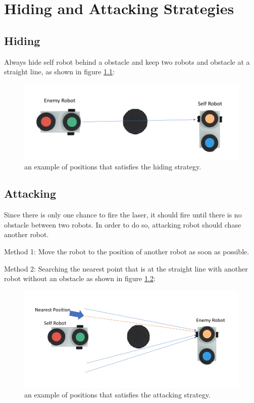 \chapter{Hiding and Attacking Strategies}
\label{cha:STRATEGIES}


\section{Hiding}
Always hide self robot behind a obstacle and keep two robots and obstacle at a straight line, as shown in figure \ref{hiding_strategy}:

\begin{figure}[thb]
    \centering
    \includegraphics[width=1\textwidth]{images/hiding_strategy.png}
    \caption[hiding strategy]{an example of positions that satisfies the hiding strategy.}\label{hiding_strategy}
\end{figure}

\section{Attacking}
Since there is only one chance to fire the laser, it should fire until there is no obstacle between two robots. In order to do so, attacking robot should chase another robot. 

Method 1:
Move the robot to the position of another robot as soon as possible.

Method 2:
Searching the nearest point that is at the straight line with another robot without an obstacle as shown in figure \ref{attacking_method2}:

\begin{figure}[thb]
    \centering
    \includegraphics[width=1\textwidth]{images/attacking_method2.png}
    \caption[attacking method]{an example of positions that satisfies the attacking strategy.}\label{attacking_method2}
\end{figure}
